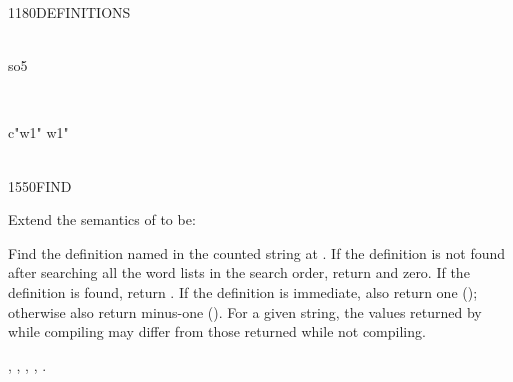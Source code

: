 \begin{worddef}{1180}{DEFINITIONS}
\begin{testing}
		   \\
		\word{:} so5       \word{;}

		 \\

		\word{:} c"w1"  w1" \word{;} \\
		 \\
	\end{testing}
\end{worddef}


\begin{worddef}{1550}{FIND}
\item Extend the semantics of  to be:


	Find the definition named in the counted string at .
	If the definition is not found after searching all the word lists
	in the search order, return  and zero. If
	the definition is found, return . If the definition is
	immediate, also return one (); otherwise also return
	minus-one (). For a given string, the values returned
	by  while compiling may differ from those returned
	while not compiling.

\see {},
	,
	,
	,
	.

	\begin{implement} %


\end{implement}
\end{worddef}
